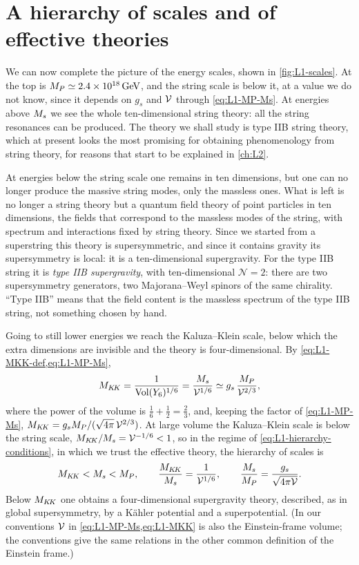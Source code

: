 \section{A hierarchy of scales and of effective theories}
\label{sec:L1-hierarchy}

We can now complete the picture of the energy scales, shown in \cref{fig:L1-scales}. At the top is $M_{P}\simeq 2.4\times10^{18}\,\mathrm{GeV}$, and the string scale is below it, at a value we do not know, since it depends on $g_s$ and $\mathcal{V}$ through \cref{eq:L1-MP-Ms}. At energies above $M_{s}$ we see the whole ten-dimensional string theory: all the string resonances can be produced. The theory we shall study is type IIB string theory, which at present looks the most promising for obtaining phenomenology from string theory, for reasons that start to be explained in \cref{ch:L2}.

At energies below the string scale one remains in ten dimensions, but one can no longer produce the massive string modes, only the massless ones. What is left is no longer a string theory but a quantum field theory of point particles in ten dimensions, the fields that correspond to the massless modes of the string, with spectrum and interactions fixed by string theory. Since we started from a superstring this theory is supersymmetric, and since it contains gravity its supersymmetry is local: it is a ten-dimensional supergravity. For the type IIB string it is \emph{type IIB supergravity}, with ten-dimensional $\mathcal N=2$: there are two supersymmetry generators, two Majorana--Weyl spinors of the same chirality. ``Type IIB'' means that the field content is the massless spectrum of the type IIB string, not something chosen by hand.

Going to still lower energies we reach the Kaluza--Klein scale, below which the extra dimensions are invisible and the theory is four-dimensional. By \cref{eq:L1-MKK-def,eq:L1-MP-Ms},
\begin{equation}
  M_{K\!K} = \frac{1}{\mathrm{Vol}(Y_6)^{1/6}} = \frac{M_{s}}{\mathcal{V}^{1/6}} \simeq g_s\,\frac{M_{P}}{\mathcal{V}^{2/3}} ,
  \label{eq:L1-MKK}
\end{equation}
where the power of the volume is $\tfrac16+\tfrac12 = \tfrac23$, and, keeping the factor of \cref{eq:L1-MP-Ms}, $M_{K\!K} = g_sM_{P}/(\sqrt{4\pi}\,\mathcal{V}^{2/3})$. At large volume the Kaluza--Klein scale is below the string scale, $M_{K\!K}/M_{s} = \mathcal{V}^{-1/6}<1$, so in the regime of \cref{eq:L1-hierarchy-conditions}, in which we trust the effective theory, the hierarchy of scales is
\begin{equation}
  M_{K\!K} < M_{s} < M_{P} ,\qquad
  \frac{M_{K\!K}}{M_{s}} = \frac{1}{\mathcal{V}^{1/6}} ,\qquad
  \frac{M_{s}}{M_{P}} = \frac{g_s}{\sqrt{4\pi\mathcal{V}}} .
  \label{eq:L1-hierarchy}
\end{equation}
Below $M_{K\!K}$ one obtains a four-dimensional supergravity theory, described, as in global supersymmetry, by a Kähler potential and a superpotential. (In our conventions $\mathcal{V}$ in \cref{eq:L1-MP-Ms,eq:L1-MKK} is also the Einstein-frame volume; the conventions give the same relations in the other common definition of the Einstein frame.)

